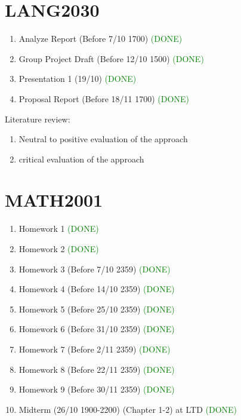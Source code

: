 \documentclass[11pt]{article}
\begin{document}
\section{LANG2030}
\begin{enumerate}
    \item Analyze Report (Before 7/10 1700) \textcolor{green}{(DONE)}
    \item Group Project Draft (Before 12/10 1500) \textcolor{green}{(DONE)}
    \item Presentation 1 (19/10) \textcolor{green}{(DONE)}
    \item Proposal Report (Before 18/11 1700) \textcolor{green}{(DONE)}
\end{enumerate}
Literature review: 
\begin{enumerate}
    \item Neutral to positive evaluation of the approach
    \item critical evaluation of the approach
\end{enumerate}




\section{MATH2001}
\begin{enumerate}
    \item Homework 1 \textcolor{green}{(DONE)}
    \item Homework 2 \textcolor{green}{(DONE)}
    \item Homework 3 (Before 7/10 2359) \textcolor{green}{(DONE)}
    \item Homework 4 (Before 14/10 2359) \textcolor{green}{(DONE)}
    \item Homework 5 (Before 25/10 2359) \textcolor{green}{(DONE)}
    \item Homework 6 (Before 31/10 2359) \textcolor{green}{(DONE)}
    \item Homework 7 (Before 2/11 2359) \textcolor{green}{(DONE)}
    \item Homework 8 (Before 22/11 2359) \textcolor{green}{(DONE)}
    \item Homework 9 (Before 30/11 2359) \textcolor{green}{(DONE)}
    \item Midterm (26/10 1900-2200) (Chapter 1-2) at LTD \textcolor{green}{(DONE)}
\end{enumerate}
\end{document}
